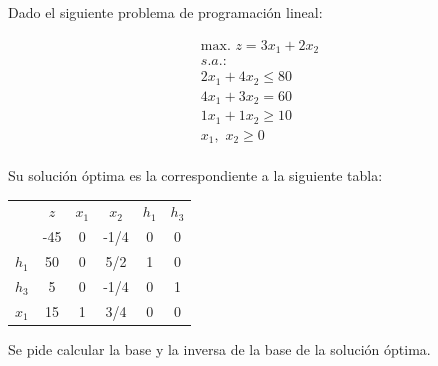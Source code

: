 Dado el siguiente problema de programación lineal:

\begin{equation}
\begin{split}
\mbox{max. } z = 3x_1 + 2x_2\\
s.a.:\\
2x_1 + 4x_2  \leq 80\\
4x_1 + 3x_2  = 60\\
1x_1 + 1x_2  \geq 10\\
x_1,\,\,x_2\geq 0\\
\end{split}
\end{equation}

Su solución óptima es la correspondiente a la siguiente tabla:

\begin{center}
\begin{tabular}{c|c|cccc|}
 & $z$ & $x_1$ & $x_2$ & $h_1$ & $h_3$\\ 
       & -45 & 0 & -1/4 & 0 & 0  \\ 
\hline
$h_1$ & 50  & 0 & 5/2 & 1 & 0 \\ 
$h_3$ & 5  & 0 & -1/4 & 0 & 1 \\ 
$x_1$ & 15  & 1 & 3/4 & 0 & 0 \\ 
\hline
\end{tabular}
\end{center}


Se pide calcular la base y la inversa de la base de la solución óptima.